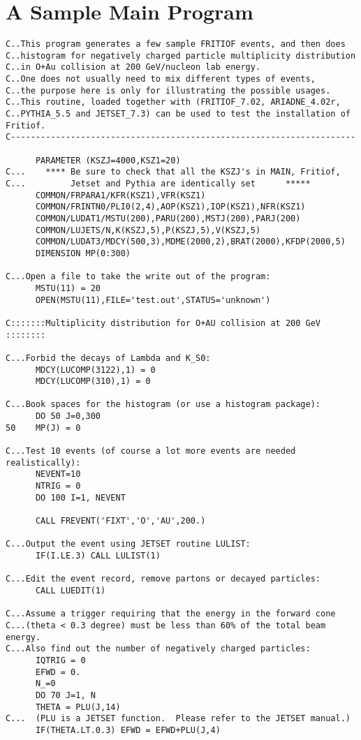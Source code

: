 \section{A Sample Main Program}
\begin{verbatim}
C..This program generates a few sample FRITIOF events, and then does
C..histogram for negatively charged particle multiplicity distribution
C..in O+Au collision at 200 GeV/nucleon lab energy.
C..One does not usually need to mix different types of events, 
C..the purpose here is only for illustrating the possible usages.  
C..This routine, loaded together with (FRITIOF_7.02, ARIADNE_4.02r,
C..PYTHIA_5.5 and JETSET_7.3) can be used to test the installation of Fritiof.  
C---------------------------------------------------------------------

      PARAMETER (KSZJ=4000,KSZ1=20)
C...    **** Be sure to check that all the KSZJ's in MAIN, Fritiof,
C...         Jetset and Pythia are identically set      *****
      COMMON/FRPARA1/KFR(KSZ1),VFR(KSZ1)
      COMMON/FRINTN0/PLI0(2,4),AOP(KSZ1),IOP(KSZ1),NFR(KSZ1)
      COMMON/LUDAT1/MSTU(200),PARU(200),MSTJ(200),PARJ(200)
      COMMON/LUJETS/N,K(KSZJ,5),P(KSZJ,5),V(KSZJ,5)
      COMMON/LUDAT3/MDCY(500,3),MDME(2000,2),BRAT(2000),KFDP(2000,5)
      DIMENSION MP(0:300)

C...Open a file to take the write out of the program:
      MSTU(11) = 20
      OPEN(MSTU(11),FILE='test.out',STATUS='unknown')

C:::::::Multiplicity distribution for O+AU collision at 200 GeV ::::::::

C...Forbid the decays of Lambda and K_S0: 
      MDCY(LUCOMP(3122),1) = 0
      MDCY(LUCOMP(310),1) = 0

C...Book spaces for the histogram (or use a histogram package):
      DO 50 J=0,300
50    MP(J) = 0

C...Test 10 events (of course a lot more events are needed realistically):
      NEVENT=10
      NTRIG = 0
      DO 100 I=1, NEVENT

      CALL FREVENT('FIXT','O','AU',200.)

C...Output the event using JETSET routine LULIST:
      IF(I.LE.3) CALL LULIST(1)

C...Edit the event record, remove partons or decayed particles:
      CALL LUEDIT(1)

C...Assume a trigger requiring that the energy in the forward cone
C...(theta < 0.3 degree) must be less than 60% of the total beam energy.
C...Also find out the number of negatively charged particles:
      IQTRIG = 0
      EFWD = 0.
      N_=0
      DO 70 J=1, N
      THETA = PLU(J,14)
C...  (PLU is a JETSET function.  Please refer to the JETSET manual.)
      IF(THETA.LT.0.3) EFWD = EFWD+PLU(J,4)


\end{verbatim}
